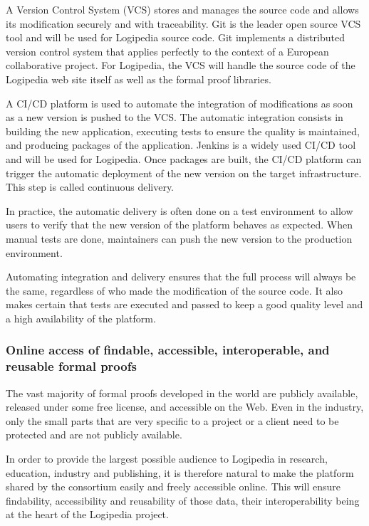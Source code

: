 \begin{compactitem}
\item
A Version Control System (VCS) stores and manages the source code and
allows its modification securely and with traceability. Git is the leader
open source VCS tool and will be used for Logipedia source code. Git implements
a distributed version control system that applies perfectly to the context of
a European collaborative project. For Logipedia, the VCS will handle the
source code of the Logipedia web site itself as well as the formal proof libraries.
\item
A CI/CD platform is used to automate the integration of modifications
as soon as a new version is pushed to the VCS. The automatic integration
consists in building the new application, executing tests to ensure
the quality is maintained, and producing packages of the application.
Jenkins is a widely used CI/CD tool and will be used for Logipedia.
Once packages are built, the CI/CD platform can trigger the automatic
deployment of the new version on the target infrastructure.
This step is called continuous delivery.
\end{compactitem}

In practice, the automatic delivery is often done on a test environment
to allow users to verify that the new version of the platform
behaves as expected. When manual tests are done, maintainers can push
the new version to the production environment.

Automating integration and delivery ensures that the full process
will always be the same, regardless of who made the modification
of the source code. It also makes certain that tests are executed and passed
to keep a good quality level and a high availability of the platform.

\subsubsection*{Online access of findable, accessible, interoperable, and
reusable formal proofs}

The vast majority of formal proofs developed in the world are publicly
available, released under some free license, and accessible on the
Web. Even in the industry, only the small parts that are very specific
to a project or a client need to be protected and are not publicly
available.

In order to provide the largest possible audience to Logipedia in
research, education, industry and publishing, it is therefore natural
to make the platform shared by the consortium easily and freely
accessible online. This will ensure findability,
accessibility and reusability of those data, their interoperability
being at the heart of the Logipedia project.

